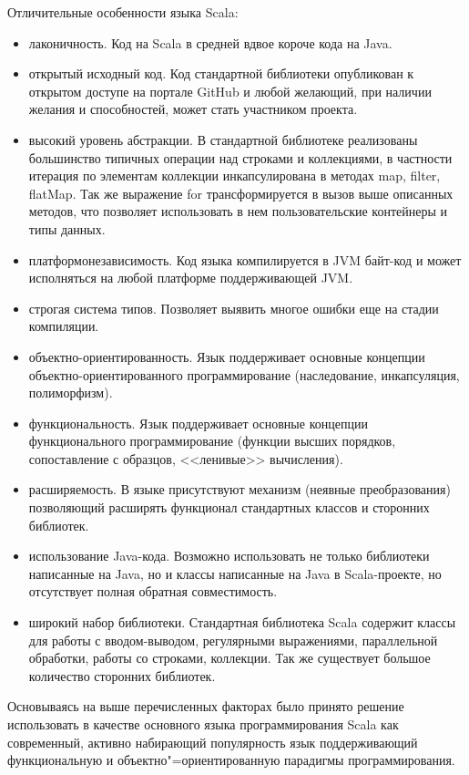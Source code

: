 Отличительные особенности языка Scala:
\begin{itemize}
  \item лаконичность. Код на Scala в средней вдвое короче кода на Java.
  \item открытый исходный код. Код стандартной библиотеки опубликован к открытом доступе на портале GitHub и любой желающий, при наличии желания и способностей, может стать участником проекта.
  \item высокий уровень абстракции. В стандартной библиотеке реализованы большинство типичных операции над строками и коллекциями, в частности итерация по элементам коллекции инкапсулирована в методах map, filter, flatMap. Так же выражение for трансформируется в вызов выше описанных методов, что позволяет использовать в нем пользовательские контейнеры и типы данных. 
  \item платформонезависимость. Код языка компилируется в JVM байт-код и может исполняться на любой платформе поддерживающей JVM.
  \item строгая система типов. Позволяет выявить многое ошибки еще на стадии компиляции.
  \item объектно-ориентированность. Язык поддерживает основные концепции объектно-ориентированного программирование (наследование, инкапсуляция, полиморфизм).
  \item функциональность. Язык поддерживает основные концепции функционального программирование (функции высших порядков, сопоставление с образцов, <<ленивые>> вычисления).
  \item расширяемость. В языке присутствуют механизм (неявные преобразования) позволяющий расширять функционал стандартных классов и сторонних библиотек.
  \item использование Java-кода. Возможно использовать не только библиотеки написанные на Java, но и классы написанные на Java в Scala-проекте, но отсутствует полная обратная совместимость.
  \item широкий набор библиотеки. Стандартная библиотека Scala содержит классы для работы с вводом-выводом, регулярными выражениями, параллельной обработки, работы со строками, коллекции. Так же существует большое количество сторонних библиотек.
\end{itemize}

Основываясь на выше перечисленных факторах было принято решение использовать в качестве основного языка программирования Scala как современный, активно набирающий популярность язык поддерживающий функциональную и объектно"=ориентированную парадигмы программирования.

